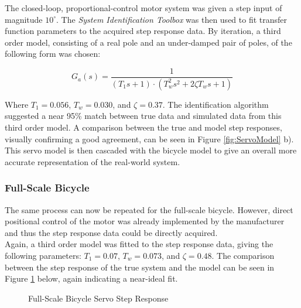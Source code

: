 The closed-loop, proportional-control motor system was given a step input of magnitude $10^{\circ}$. The \textit{System Identification Toolbox} was then used to fit transfer function parameters to the acquired step response data. By iteration, a third order model, consisting of a real pole and an under-damped pair of poles, of the following form was chosen:

\begin{equation}
G_a(s) = \frac{1}{(T_1 s + 1) \cdot (T^2_w s^2 + 2 \zeta T_w s + 1)}
\end{equation}

Where $T_1 = 0.056$, $T_w = 0.030$, and $\zeta = 0.37$. The identification algorithm suggested a near 95\% match between true data and simulated data from this third order model. A comparison between the true and model step responses, visually confirming a good agreement, can be seen in Figure \ref{fig:ServoModel} b). \\

This servo model is then cascaded with the bicycle model to give an overall more accurate representation of the real-world system.

\subsubsection{Full-Scale Bicycle}
The same process can now be repeated for the full-scale bicycle. However, direct positional control of the motor was already implemented by the manufacturer and thus the step response data could be directly acquired. \\

Again, a third order model was fitted to the step response data, giving the following parameters: $T_1 = 0.07$, $T_w = 0.073$, and $\zeta = 0.48$. The comparison between the step response of the true system and the model can be seen in Figure \ref{fig:FSServoModel} below, again indicating a near-ideal fit. 

\begin{figure}[H]
	\centering
	\caption{Full-Scale Bicycle Servo Step Response}
	\label{fig:FSServoModel}
\end{figure}

